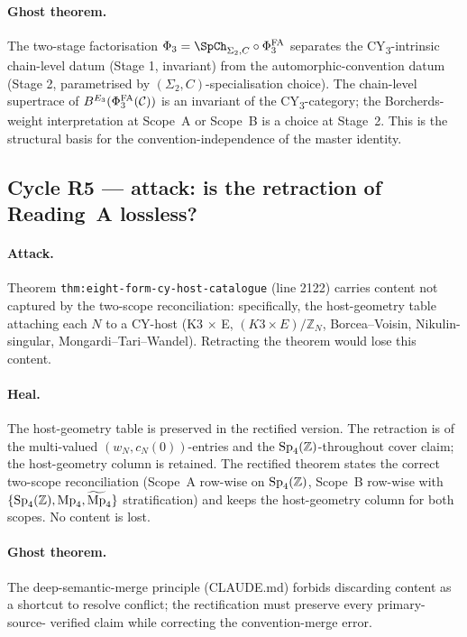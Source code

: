 \paragraph{Ghost theorem.} The two-stage factorisation $\Phi_3 =
\SpCh_{\Sigma_2, C} \circ \PhiFAt$ separates the CY\textsubscript{3}-intrinsic
chain-level datum (Stage 1, invariant) from the automorphic-convention
datum (Stage 2, parametrised by $(\Sigma_2, C)$-specialisation
choice). The chain-level supertrace of $B^{E_{3}}(\Phi^{\mathrm{FA}}_3(\mathcal C))$ is an
invariant of the CY\textsubscript{3}-category; the Borcherds-weight
interpretation at Scope~A or Scope~B is a choice at Stage~2. This is
the structural basis for the convention-independence of the master
identity.

\subsection*{Cycle R5 --- attack: is the retraction of Reading~A
lossless?}

\paragraph{Attack.} Theorem \texttt{thm:eight-form-cy-host-catalogue}
(line 2122) carries content not captured by the two-scope
reconciliation: specifically, the host-geometry table attaching each
$N$ to a CY-host (K3 $\times$ E, $(K3 \times E)/\mathbb Z_N$,
Borcea--Voisin, Nikulin-singular, Mongardi--Tari--Wandel). Retracting
the theorem would lose this content.

\paragraph{Heal.} The host-geometry table is preserved in the rectified
version. The retraction is of the multi-valued $(w_N, c_N(0))$-entries
and the $\mathrm{Sp}_4(\mathbb Z)$-throughout cover claim; the host-geometry column is
retained. The rectified theorem states the correct two-scope
reconciliation (Scope~A row-wise on $\mathrm{Sp}_4(\mathbb Z)$, Scope~B row-wise with
$\{\mathrm{Sp}_4(\mathbb Z), \mathrm{Mp}_4, \widetilde{\mathrm{Mp}}_4\}$ stratification) and keeps the
host-geometry column for both scopes. No content is lost.

\paragraph{Ghost theorem.} The deep-semantic-merge principle
(CLAUDE.md) forbids discarding content as a shortcut to resolve
conflict; the rectification must preserve every primary-source-
verified claim while correcting the convention-merge error.

